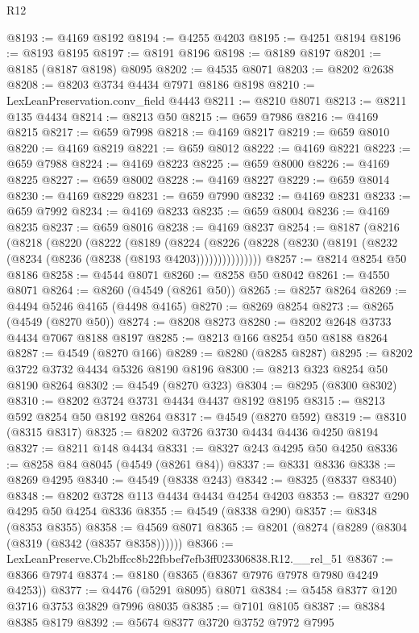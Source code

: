 \begin{lexlean}{R12}
\begin{coremodule}
@8193 := @4169 @8192
@8194 := @4255 @4203
@8195 := @4251 @8194
@8196 := @8193 @8195
@8197 := @8191 @8196
@8198 := @8189 @8197
@8201 := @8185 (@8187 @8198) @8095
@8202 := @4535 @8071
@8203 := @8202 @2638
@8208 := @8203 @3734 @4434 @7971 @8186 @8198
@8210 := LexLeanPreservation.conv_field @4443
@8211 := @8210 @8071
@8213 := @8211 @135 @4434
@8214 := @8213 @50
@8215 := @659 @7986
@8216 := @4169 @8215
@8217 := @659 @7998
@8218 := @4169 @8217
@8219 := @659 @8010
@8220 := @4169 @8219
@8221 := @659 @8012
@8222 := @4169 @8221
@8223 := @659 @7988
@8224 := @4169 @8223
@8225 := @659 @8000
@8226 := @4169 @8225
@8227 := @659 @8002
@8228 := @4169 @8227
@8229 := @659 @8014
@8230 := @4169 @8229
@8231 := @659 @7990
@8232 := @4169 @8231
@8233 := @659 @7992
@8234 := @4169 @8233
@8235 := @659 @8004
@8236 := @4169 @8235
@8237 := @659 @8016
@8238 := @4169 @8237
@8254 := @8187
    (@8216
      (@8218
        (@8220
          (@8222
            (@8189
              (@8224
                (@8226 (@8228 (@8230 (@8191 (@8232 (@8234 (@8236 (@8238 (@8193 @4203)))))))))))))))
@8257 := @8214 @8254 @50 @8186
@8258 := @4544 @8071
@8260 := @8258 @50 @8042
@8261 := @4550 @8071
@8264 := @8260 (@4549 (@8261 @50))
@8265 := @8257 @8264
@8269 := @4494 @5246 @4165 (@4498 @4165)
@8270 := @8269 @8254
@8273 := @8265 (@4549 (@8270 @50))
@8274 := @8208 @8273
@8280 := @8202 @2648 @3733 @4434 @7067 @8188 @8197
@8285 := @8213 @166 @8254 @50 @8188 @8264
@8287 := @4549 (@8270 @166)
@8289 := @8280 (@8285 @8287)
@8295 := @8202 @3722 @3732 @4434 @5326 @8190 @8196
@8300 := @8213 @323 @8254 @50 @8190 @8264
@8302 := @4549 (@8270 @323)
@8304 := @8295 (@8300 @8302)
@8310 := @8202 @3724 @3731 @4434 @4437 @8192 @8195
@8315 := @8213 @592 @8254 @50 @8192 @8264
@8317 := @4549 (@8270 @592)
@8319 := @8310 (@8315 @8317)
@8325 := @8202 @3726 @3730 @4434 @4436 @4250 @8194
@8327 := @8211 @148 @4434
@8331 := @8327 @243 @4295 @50 @4250
@8336 := @8258 @84 @8045 (@4549 (@8261 @84))
@8337 := @8331 @8336
@8338 := @8269 @4295
@8340 := @4549 (@8338 @243)
@8342 := @8325 (@8337 @8340)
@8348 := @8202 @3728 @113 @4434 @4434 @4254 @4203
@8353 := @8327 @290 @4295 @50 @4254 @8336
@8355 := @4549 (@8338 @290)
@8357 := @8348 (@8353 @8355)
@8358 := @4569 @8071
@8365 := @8201 (@8274 (@8289 (@8304 (@8319 (@8342 (@8357 @8358))))))
@8366 := LexLeanPreserve.Cb2bffcc8b22fbbef7efb3ff023306838.R12.__rel_51
@8367 := @8366 @7974
@8374 := @8180 (@8365 (@8367 @7976 @7978 @7980 @4249 @4253))
@8377 := @4476 (@5291 @8095) @8071
@8384 := @5458 @8377 @120 @3716 @3753 @3829 @7996 @8035
@8385 := @7101 @8105
@8387 := @8384 @8385 @8179
@8392 := @5674 @8377 @3720 @3752 @7972 @7995

\end{coremodule}
\end{lexlean}
